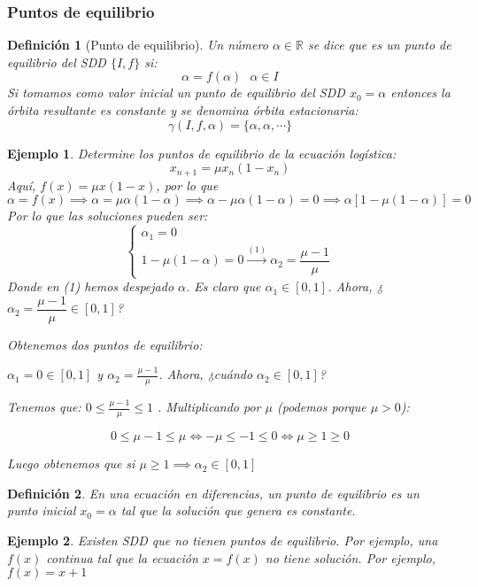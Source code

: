 \documentclass[11pt, a4paper]{article}
\newif\IfInSansMode
\numberwithin{equation}{section}
\newcommand{\R}{\mathbb{R}}
\theoremstyle{theorem-style}
\theoremstyle{definition-style}
\newtheorem{ndef}{Definición}[section]
\theoremstyle{remark-style}
\theoremstyle{example-style}
\newtheorem{ejemplo}{Ejemplo}[section]
\begin{document}
\subsubsection{Puntos de equilibrio}
\begin{ndef}[Punto de equilibrio]
	Un número $\alpha \in \R$ se dice que es un punto de equilibrio del SDD $\{I,f\}$ si:
	\[
	\alpha = f(\alpha) \ \ \ \alpha \in I
	\]
	Si tomamos como valor inicial un punto de equilibrio del SDD $x_0 = \alpha$ entonces la órbita resultante es constante y se denomina órbita estacionaria:
	\[
	\gamma(I,f,\alpha) = \{\alpha, \alpha, \cdots\}
	\]
\end{ndef}
\begin{ejemplo}
	Determine los puntos de equilibrio de la ecuación logística:
	\[
	x_{n+1} = \mu x_n(1-x_n)
	\]
	Aquí, $f(x) = \mu x(1-x)$, por lo que
	 \[
	\alpha = f(x) \implies \alpha = \mu \alpha (1-\alpha) \implies \alpha - \mu \alpha(1-\alpha) = 0 \implies \alpha[1-\mu(1-\alpha)] = 0
	\]
	Por lo que las soluciones pueden ser:
	\[
	\begin{cases}
	\alpha_1 = 0\\
	1-\mu(1-\alpha) = 0 \xrightarrow{(1)} \alpha_2 = \dfrac{\mu -1}{\mu}
\end{cases}
	\]
	Donde en (1) hemos despejado $\alpha$. Es claro que $\alpha_1 \in [0,1]$. Ahora, ¿$\alpha_2=  \dfrac{\mu -1}{\mu} \in [0,1] $?
	

	Obtenemos dos puntos de equilibrio:

	$ \alpha_{1} = 0 \in [0,1] $ y $ \alpha_{2}= \frac{\mu - 1}{\mu} $. Ahora, ¿cuándo $\alpha_2\in [0,1] $?

	Tenemos que: $ 0 \leq \frac{\mu - 1}{\mu} \leq 1 $ . Multiplicando por $\mu$ (podemos porque $\mu > 0$):

	$$ 0 \leq \mu - 1 \leq \mu \Leftrightarrow -\mu \leq -1 \leq 0 \Leftrightarrow \mu \geq 1 \geq 0 $$

	Luego obtenemos que si $\mu \geq 1 \implies \alpha_{2} \in [0,1] $

\end{ejemplo}

\begin{ndef}
	En una ecuación en diferencias, un punto de equilibrio es un punto inicial $x_0= \alpha$ tal que la solución que genera es constante.
\end{ndef}

\begin{ejemplo}
	Existen SDD que no tienen puntos de equilibrio. Por ejemplo, una $f(x)$ continua tal que la ecuación $x = f(x)$ no tiene solución. Por ejemplo, $f(x) = x+1$
\end{ejemplo}
\end{document}
